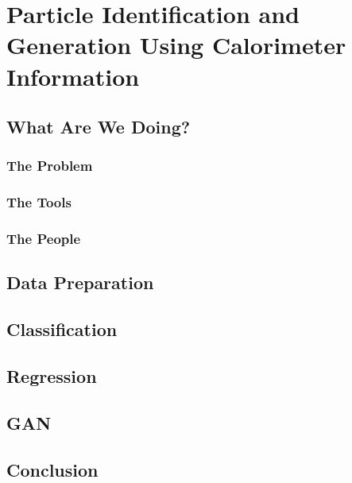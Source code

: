 \chapter{Particle Identification and Generation Using Calorimeter Information}

\section{What Are We Doing?}

\subsection{The Problem}

\subsection{The Tools}

\subsection{The People}

\section{Data Preparation}

\section{Classification}

\section{Regression}

\section{GAN}

\section{Conclusion}
